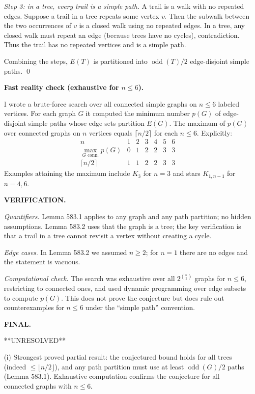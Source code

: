 \emph{Step 3: in a tree, every trail is a simple path.}
A trail is a walk with no repeated edges.
Suppose a trail in a tree repeats some vertex $v$.
Then the subwalk between the two occurrences of $v$ is a closed walk using no repeated edges.
In a tree, any closed walk must repeat an edge (because trees have no cycles), contradiction.
Thus the trail has no repeated vertices and is a simple path.

Combining the steps, $E(T)$ is partitioned into $\operatorname{odd}(T)/2$ edge-disjoint simple paths.
\qed

\bigskip
\noindent\textbf{Fast reality check (exhaustive for $n\le 6$).}

I wrote a brute-force search over all connected simple graphs on $n\le 6$ labeled vertices.
For each graph $G$ it computed the minimum number $p(G)$ of edge-disjoint simple paths whose edge sets partition $E(G)$.
The maximum of $p(G)$ over connected graphs on $n$ vertices equals $\lceil n/2\rceil$ for each $n\le 6$.
Explicitly:
\[
\begin{array}{c|cccccc}
 n & 1&2&3&4&5&6\\\hline
 \max_{G\text{ conn.}} p(G) & 0&1&2&2&3&3\\
 \lceil n/2\rceil & 1&1&2&2&3&3
\end{array}
\]
Examples attaining the maximum include $K_3$ for $n=3$ and stars $K_{1,n-1}$ for $n=4,6$.

\bigskip
\noindent\textbf{VERIFICATION.}

\emph{Quantifiers.} Lemma 583.1 applies to any graph and any path partition; no hidden assumptions.
Lemma 583.2 uses that the graph is a tree; the key verification is that a trail in a tree cannot revisit a vertex without creating a cycle.

\emph{Edge cases.} In Lemma 583.2 we assumed $n\ge 2$; for $n=1$ there are no edges and the statement is vacuous.

\emph{Computational check.} The search was exhaustive over all $2^{\binom n2}$ graphs for $n\le 6$, restricting to connected ones, and used dynamic programming over edge subsets to compute $p(G)$.
This does not prove the conjecture but does rule out counterexamples for $n\le 6$ under the ``simple path'' convention.

\bigskip
\noindent\textbf{FINAL.}

**UNRESOLVED**

(i) Strongest proved partial result: the conjectured bound holds for all trees (indeed $\le\lfloor n/2\rfloor$), and any path partition must use at least $\operatorname{odd}(G)/2$ paths (Lemma 583.1). Exhaustive computation confirms the conjecture for all connected graphs with $n\le 6$.

